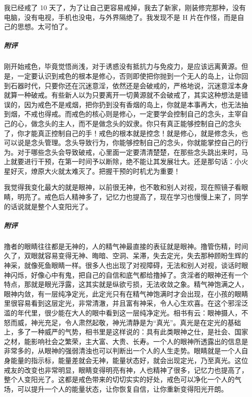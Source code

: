 \begin{case}
    我已经戒了 10 天了，为了让自己更容易戒掉，我去了新家，刚装修完那种，没有电脑，没有电视，手机也没电，与外界隔绝了。我发现不是 H 片在作怪，而是自己的思想。太可怕了。
    \subparagraph{附评} 刚开始戒色，毕竟觉悟尚浅，对于诱惑没有抵抗力与免疫力，是应该远离黄源。但是，一定要认识到戒色的根本是修心，否则即使把你抛到一个无人的岛上，让你回到石器时代，只要你还在沉迷意淫，依然还是会破戒的，严格地说，沉迷意淫本身就算一种破戒。有些新人以为只要离开一切黄源就不会破戒了，其实这种想法是错误的，因为戒色不是戒烟，把你扔到没有香烟的岛上，你就是本事再大，也无法抽到烟，不戒也得戒。而戒色的核心则是修心，一定要学会控制自己的念头，主宰自己的心，做念头的主人，而不是做念头的奴隶。你只有真正能够控制自己的念头了，你才能真正控制自己的手！戒色的根本就是控念！就是修心，就是修念头，也可以说是念头管理。念头导致行为，你能够控制自己的念头，你就能掌控自己的行为。对于哪些念头会导致破戒，心里面一定要清清楚楚，在那些念头跳出来时，马上就要进行干预，在第一时间予以断除，绝不能让其发展壮大。还是那句话：小火星好灭，燎原大火就太难灭了。把握干预的时机尤为重要！
\end{case}

\begin{case}
    我觉得我变化最大的就是眼神，以前很无神，也不敢和别人对视，现在照镜子看眼睛，明亮了。戒色后人精神多了，记忆力也提高了，现在学习也慢慢上来了，同学的话说就是整个人变阳光了。
    \subparagraph{附评} 撸者的眼睛往往都是无神的，人的精气神最直接的表征就是眼神。撸管伤精，时间久了，双眼就容易变得无神、晦暗、空洞、呆滞，失去定光，失去那种顾盼生辉的神采，就像死鱼眼睛一样。很多人也出现了对视障碍，无法和别人对视，谈话时眼神闪烁，好像心中有鬼，把自己的自信和底气都给撸掉了。贪淫者的眼神还有一个特点，那就是眼光浮露，这其实就是纵欲亏损，无法收敛之象。精气神饱满之人，眼神内敛，有一层纯净定光，此定光只有在精气神饱满时才会出现，在小孩的眼睛里很容易看到这层定光，非常清澈，并且富有神采，令人心生欢喜。在这个邪淫泛滥的年代里，很少能在大人的眼中看到这一层纯净定光。相书有云：眼神摄人，不怒而威，神光充足，令人肃然起敬，神光清静是为“真光”。真光是在定光的基础上，多了一种威严的气势，相书里是这样说的：具有此类眼神之仕，是社会、国家之材，能影响社会之繁荣，主大富、大贵、长寿。一个人的眼神所透露出的信息是非常多的，从眼神的强弱清浊也可以判断出一个人的人生走势。眼睛就是一个人自身能量的指示标，能量差就会无神，能量状态好，就会出现定光，乃至真光。这位戒友的改变也非常明显，眼睛变得明亮有神，人也精神了很多，记忆力也提高了，整个人变阳光了。这都是戒色带来的切切实实的好处，戒色可以净化一个人的气场，可以提升一个人的能量状态，让你恢复自信，让你重新变得阳光开朗。
\end{case}

